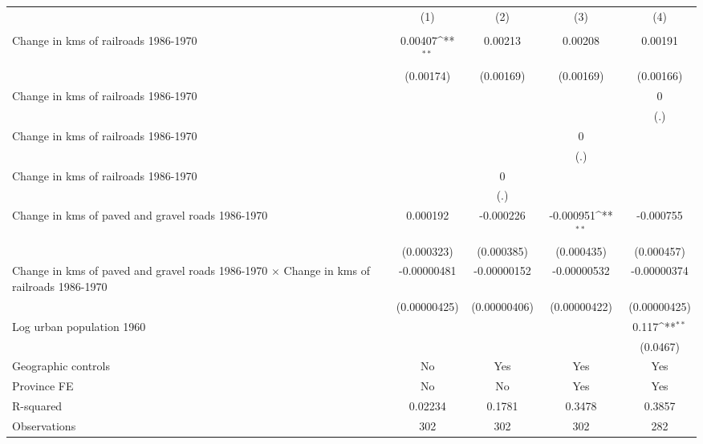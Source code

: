 {
\def\sym#1{\ifmmode^{#1}\else\(^{#1}\)\fi}
\begin{tabular}{l*{4}{c}}
\hline\hline
                &\multicolumn{1}{c}{(1)}&\multicolumn{1}{c}{(2)}&\multicolumn{1}{c}{(3)}&\multicolumn{1}{c}{(4)}\\
                &\multicolumn{1}{c}{}&\multicolumn{1}{c}{}&\multicolumn{1}{c}{}&\multicolumn{1}{c}{}\\
\hline
Change in kms of railroads 1986-1970&  0.00407\sym{**} &  0.00213         &  0.00208         &  0.00191         \\
                &(0.00174)         &(0.00169)         &(0.00169)         &(0.00166)         \\
[1em]
Change in kms of railroads 1986-1970&                  &                  &                  &        0         \\
                &                  &                  &                  &      (.)         \\
[1em]
Change in kms of railroads 1986-1970&                  &                  &        0         &                  \\
                &                  &                  &      (.)         &                  \\
[1em]
Change in kms of railroads 1986-1970&                  &        0         &                  &                  \\
                &                  &      (.)         &                  &                  \\
[1em]
Change in kms of paved and gravel roads 1986-1970& 0.000192         &-0.000226         &-0.000951\sym{**} &-0.000755         \\
                &(0.000323)         &(0.000385)         &(0.000435)         &(0.000457)         \\
[1em]
Change in kms of paved and gravel roads 1986-1970 $\times$ Change in kms of railroads 1986-1970&-0.00000481         &-0.00000152         &-0.00000532         &-0.00000374         \\
                &(0.00000425)         &(0.00000406)         &(0.00000422)         &(0.00000425)         \\
[1em]
Log urban population 1960&                  &                  &                  &    0.117\sym{**} \\
                &                  &                  &                  & (0.0467)         \\
\hline
Geographic controls&       No         &      Yes         &      Yes         &      Yes         \\
Province FE     &       No         &       No         &      Yes         &      Yes         \\
R-squared       &  0.02234         &   0.1781         &   0.3478         &   0.3857         \\
Observations    &      302         &      302         &      302         &      282         \\
\hline\hline
\end{tabular}
}
